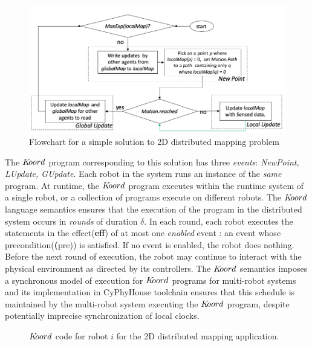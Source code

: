 \begin{figure}[!htbp]
    \centering
    \includegraphics[width=\linewidth]{figs/map_flowchart.png}
    \caption{Flowchart for a simple solution to 2D distributed mapping problem\vspace{-2mm}}
    \label{fig:flowmap1}
\end{figure}

The $K\kern-2pt oord$ program corresponding to this solution has three \emph{events}: \emph{NewPoint, LUpdate, GUpdate}. Each robot in the system runs an instance of the \emph{same} program. At runtime, the $K\kern-2pt oord$ program executes within the runtime system of a single robot, or a collection of programs execute on different robots. The $K\kern-2pt oord$ language semantics ensures that the execution of the program in the distributed system occurs in \emph{rounds} of duration $\delta$. In each round, each robot executes the statements in the effect(\textbf{eff}) of at most one \emph{enabled} event : an event whose precondition(\textbf(pre)) is satisfied. If no event is enabled, the robot does nothing. Before the next round of execution, the robot may continue to interact with the physical environment as directed by its controllers. The $K\kern-2pt oord$ semantics imposes a synchronous model of execution for $K\kern-2pt oord$ programs for multi-robot systems and its implementation in CyPhyHouse toolchain ensures that this schedule is maintained by the multi-robot system executing the $K\kern-2pt oord$ program, despite potentially imprecise synchronization of local clocks.

\begin{figure}[!htbp]
    \noindent
    \begin{mdframed}

        \begin{center}
            \scriptsize
            {}
            {}
        \end{center}
    \end{mdframed}

    \caption{$K\kern-2pt oord$ code for robot $i$ for the 2D distributed mapping application. \vspace{-5mm}}
    \label{fig:mapapp}
\end{figure}


